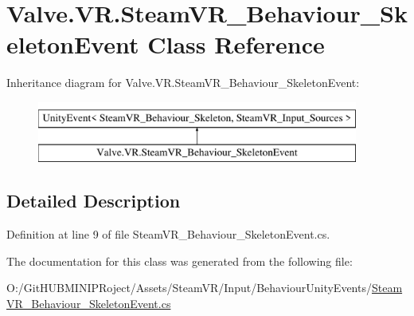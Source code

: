 \hypertarget{class_valve_1_1_v_r_1_1_steam_v_r___behaviour___skeleton_event}{}\section{Valve.\+V\+R.\+Steam\+V\+R\+\_\+\+Behaviour\+\_\+\+Skeleton\+Event Class Reference}
\label{class_valve_1_1_v_r_1_1_steam_v_r___behaviour___skeleton_event}
Inheritance diagram for Valve.\+V\+R.\+Steam\+V\+R\+\_\+\+Behaviour\+\_\+\+Skeleton\+Event\+:\begin{figure}[H]
\begin{center}
\leavevmode
\includegraphics[height=2.000000cm]{class_valve_1_1_v_r_1_1_steam_v_r___behaviour___skeleton_event}
\end{center}
\end{figure}


\subsection{Detailed Description}


Definition at line 9 of file Steam\+V\+R\+\_\+\+Behaviour\+\_\+\+Skeleton\+Event.\+cs.



The documentation for this class was generated from the following file\+:\begin{DoxyCompactItemize}
\item 
O\+:/\+Git\+H\+U\+B\+M\+I\+N\+I\+P\+Roject/\+Assets/\+Steam\+V\+R/\+Input/\+Behaviour\+Unity\+Events/\mbox{\hyperlink{_steam_v_r___behaviour___skeleton_event_8cs}{Steam\+V\+R\+\_\+\+Behaviour\+\_\+\+Skeleton\+Event.\+cs}}\end{DoxyCompactItemize}
